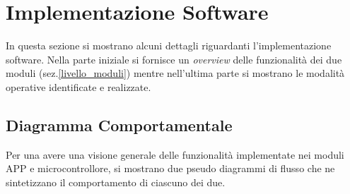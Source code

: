 \section{Implementazione Software}
In questa sezione si mostrano alcuni dettagli riguardanti l'implementazione software. Nella parte iniziale si fornisce un \textit{overview} delle funzionalità dei due moduli (sez.\ref{livello_moduli}) mentre nell'ultima parte si mostrano le modalità operative identificate e realizzate.
\subsection{Diagramma Comportamentale}
Per una avere una visione generale delle funzionalità implementate nei moduli APP e microcontrollore, si mostrano due pseudo diagrammi di flusso che ne sintetizzano il comportamento di ciascuno dei due.
